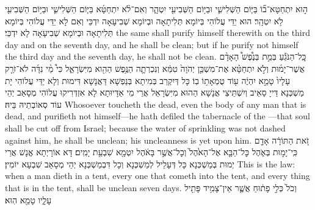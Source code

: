 {ה֣וּא יִתְחַטָּא־ב֞וֹ בַּיּ֧וֹם הַשְּׁלִישִׁ֛י וּבַיּ֥וֹם הַשְּׁבִיעִ֖י יִטְהָ֑ר וְאִם־לֹ֨א יִתְחַטָּ֜א בַּיּ֧וֹם הַשְּׁלִישִׁ֛י וּבַיּ֥וֹם הַשְּׁבִיעִ֖י לֹ֥א יִטְהָֽר׃
}
{הוּא יַדֵּי עֲלוֹהִי בְּיוֹמָא תְּלִיתָאָה וּבְיוֹמָא שְׁבִיעָאָה יִדְכֵּי וְאִם לָא יַדֵּי עֲלוֹהִי בְּיוֹמָא תְּלִיתָאָה וּבְיוֹמָא שְׁבִיעָאָה לָא יִדְכֵּי׃}
{the same shall purify himself therewith on the third day and on the seventh day, and he shall be clean; but if he purify not himself the third day and the seventh day, he shall not be clean.}{}
{כׇּֽל־הַנֹּגֵ֡עַ בְּמֵ֣ת בְּנֶ֩פֶשׁ֩ הָאָדָ֨ם אֲשֶׁר־יָמ֜וּת וְלֹ֣א יִתְחַטָּ֗א אֶת־מִשְׁכַּ֤ן יְהֹוָה֙ טִמֵּ֔א וְנִכְרְתָ֛ה הַנֶּ֥פֶשׁ הַהִ֖וא מִיִּשְׂרָאֵ֑ל כִּי֩ מֵ֨י נִדָּ֜ה לֹא־זֹרַ֤ק עָלָיו֙ טָמֵ֣א יִהְיֶ֔ה ע֖וֹד טֻמְאָת֥וֹ בֽוֹ׃
}
{כָּל דְּיִקְרַב בְּמִיתָא בְּנַפְשָׁא דַּאֲנָשָׁא דִּימוּת וְלָא יַדֵּי עֲלוֹהִי יָת מַשְׁכְּנָא דַּייָ סַאֵיב וְיִשְׁתֵּיצֵי אֲנָשָׁא הַהוּא מִיִּשְׂרָאֵל אֲרֵי מֵי אַדָּיוּתָא לָא אִזְדְּרִיקוּ עֲלוֹהִי מְסָאַב יְהֵי עוֹד סְאוֹבְתֵיהּ בֵּיהּ׃}
{Whosoever toucheth the dead, even the body of any man that is dead, and purifieth not himself—he hath defiled the tabernacle of the \lord—that soul shall be cut off from Israel; because the water of sprinkling was not dashed against him, he shall be unclean; his uncleanness is yet upon him.}{}
{זֹ֚את הַתּוֹרָ֔ה אָדָ֖ם כִּֽי־יָמ֣וּת בְּאֹ֑הֶל כׇּל־הַבָּ֤א אֶל־הָאֹ֙הֶל֙ וְכׇל־אֲשֶׁ֣ר בָּאֹ֔הֶל יִטְמָ֖א שִׁבְעַ֥ת יָמִֽים׃
}
{דָּא אוֹרָיְתָא אֱנָשׁ אֲרֵי יְמוּת בְּמַשְׁכְּנָא כָּל דְּעָלֵיל לְמַשְׁכְּנָא וְכָל דִּבְמַשְׁכְּנָא יְהֵי מְסָאַב שִׁבְעָא יוֹמִין׃}
{This is the law: when a man dieth in a tent, every one that cometh into the tent, and every thing that is in the tent, shall be unclean seven days.}{}
{וְכֹל֙ כְּלִ֣י פָת֔וּחַ אֲשֶׁ֛ר אֵין־צָמִ֥יד פָּתִ֖יל עָלָ֑יו טָמֵ֖א הֽוּא׃
}
